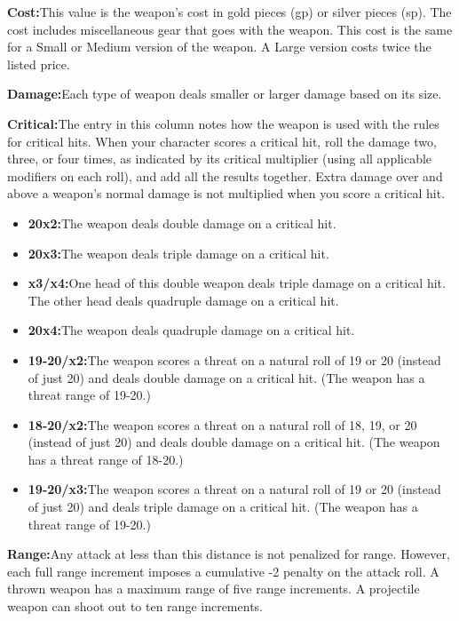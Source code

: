 {\noindent\textbf{Cost:}{This value is the weapon's cost in gold pieces (gp) or silver pieces (sp). The cost includes miscellaneous gear that goes with the weapon. This cost is the same for a Small or Medium version of the weapon. A Large version costs twice the listed price.}

\noindent\textbf{Damage:}{Each type of weapon deals smaller or larger damage based on its size.}

\noindent\textbf{Critical:}{The entry in this column notes how the weapon is used with the rules for critical hits. When your character scores a critical hit, roll the damage two, three, or four times, as indicated by its critical multiplier (using all applicable modifiers on each roll), and add all the results together. Extra damage over and above a weapon's normal damage is not multiplied when you score a critical hit.}

\begin{itemize}
  \item\noindent\textbf{20x2:}{The weapon deals double damage on a critical hit.}
  \item\noindent\textbf{20x3:}{The weapon deals triple damage on a critical hit.}
  \item\noindent\textbf{x3/x4:}{One head of this double weapon deals triple damage on a critical hit. The other head deals quadruple damage on a critical hit.}
  \item\noindent\textbf{20x4:}{The weapon deals quadruple damage on a critical hit.}
  \item\noindent\textbf{19-20/x2:}{The weapon scores a threat on a natural roll of 19 or 20 (instead of just 20) and deals double damage on a critical hit. (The weapon has a threat range of 19-20.)}
  \item\noindent\textbf{18-20/x2:}{The weapon scores a threat on a natural roll of 18, 19, or 20 (instead of just 20) and deals double damage on a critical hit. (The weapon has a threat range of 18-20.)}
  \item\noindent\textbf{19-20/x3:}{The weapon scores a threat on a natural roll of 19 or 20 (instead of just 20) and deals triple damage on a critical hit. (The weapon has a threat range of 19-20.)}
\end{itemize}

\noindent\textbf{Range:}{Any attack at less than this distance is not penalized for range. However, each full range increment imposes a cumulative -2 penalty on the attack roll. A thrown weapon has a maximum range of five range increments. A projectile weapon can shoot out to ten range increments.}

}
